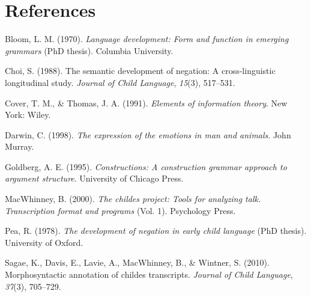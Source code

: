 \documentclass[10pt, letterpaper]{article}
\begin{document}
\hypertarget{references}{%
\section{References}\label{references}}

\setlength{\parindent}{-0.1in} 
\setlength{\leftskip}{0.125in}

\noindent

\hypertarget{refs}{}
\leavevmode\hypertarget{ref-bloom1970language}{}%
Bloom, L. M. (1970). \emph{Language development: Form and function in
emerging grammars} (PhD thesis). Columbia University.

\leavevmode\hypertarget{ref-choi1988semantic}{}%
Choi, S. (1988). The semantic development of negation: A
cross-linguistic longitudinal study. \emph{Journal of Child Language},
\emph{15}(3), 517--531.

\leavevmode\hypertarget{ref-cover_elements_1991}{}%
Cover, T. M., \& Thomas, J. A. (1991). \emph{Elements of information
theory}. New York: Wiley.

\leavevmode\hypertarget{ref-darwin1872expression}{}%
Darwin, C. (1998). \emph{The expression of the emotions in man and
animals}. John Murray.

\leavevmode\hypertarget{ref-goldberg1995constructions}{}%
Goldberg, A. E. (1995). \emph{Constructions: A construction grammar
approach to argument structure}. University of Chicago Press.

\leavevmode\hypertarget{ref-macwhinney2000childes}{}%
MacWhinney, B. (2000). \emph{The childes project: Tools for analyzing
talk. Transcription format and programs} (Vol. 1). Psychology Press.

\leavevmode\hypertarget{ref-pea1978}{}%
Pea, R. (1978). \emph{The development of negation in early child
language} (PhD thesis). University of Oxford.

\leavevmode\hypertarget{ref-sagae2010morphosyntactic}{}%
Sagae, K., Davis, E., Lavie, A., MacWhinney, B., \& Wintner, S. (2010).
Morphosyntactic annotation of childes transcripts. \emph{Journal of
Child Language}, \emph{37}(3), 705--729.


\end{document}
